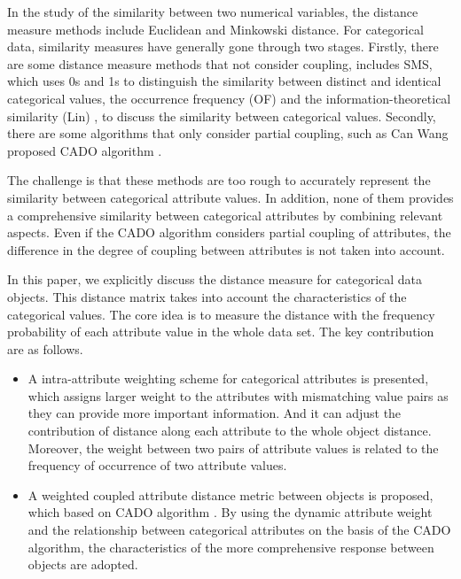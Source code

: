 \documentclass[review]{elsarticle}
\begin{document}
In the study of the similarity between two numerical variables, the distance measure methods include Euclidean and Minkowski distance. For categorical data, similarity measures have generally gone through two stages. Firstly, there are some distance measure methods that not consider coupling, includes SMS, which uses 0s and 1s to distinguish the similarity between distinct and identical categorical values, the occurrence frequency (OF) \cite{BoriahS2008Comparative} and the information-theoretical similarity (Lin) \cite{BoriahS2008Comparative}, to discuss the similarity between categorical values. Secondly, there are some algorithms that only consider partial coupling, such as Can Wang proposed CADO algorithm \cite{WangC2015CADO}.

The challenge is that these methods are too rough to accurately represent the similarity between categorical attribute values. In addition, none of them provides a comprehensive similarity between categorical attributes by combining relevant aspects. Even if the CADO algorithm considers partial coupling of attributes, the difference in the degree of coupling between attributes is not taken into account.

In this paper, we explicitly discuss the distance measure for categorical data objects. This distance matrix takes into account the characteristics of the categorical values. The core idea is to measure the distance with the frequency probability of each attribute value in the whole data set. The key contribution are as follows.
\begin{itemize}
  \item A intra-attribute weighting scheme for categorical attributes is presented, which assigns larger weight to the attributes with mismatching value pairs as they can provide more important information. And it can adjust the contribution of distance along each attribute to the whole object distance. Moreover, the weight between two pairs of attribute values is related to the frequency of occurrence of two attribute values.

  \item A weighted coupled attribute distance metric between objects is proposed, which based on CADO algorithm \cite{WangC2015CADO}. By using the dynamic attribute weight and the relationship between categorical attributes \cite{JiaH2016NewMetric} on the basis of the CADO algorithm, the characteristics of the more comprehensive response between objects are adopted.
\end{itemize}
\end{document}
